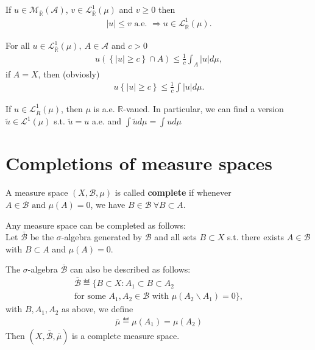 \begin{corollary}
    If \(u\in\mathcal{M}_{\overline{\mathbb{R}}}(\mathscr{A})\), \(v\in\mathcal{L}^{1}_{\overline{\mathbb{R}}}(\mu)\) and \(v\geq0\) then
    \begin{align*}
        \vert u\vert \leq v \text{ a.e. } \Rightarrow u\in\mathcal{L}^{1}_{\overline{\mathbb{R}}}(\mu).
    \end{align*}
\end{corollary}
\begin{proposition}
    For all \(u\in\mathcal{L}^{1}_{\overline{\mathbb{R}}}(\mu), \ A\in\mathscr{A}\) and \(c>0\)
    \begin{align*}
        u\left(\left\{ \vert u\vert \geq c \right\} \cap A\right) \leq \frac{1}{c}\int_{A}\vert u\vert d\mu,
    \end{align*}
    if \(A=X\), then (obviosly)
    \begin{align*}
        u\left\{ \vert u\vert \geq c \right\} \leq \frac{1}{c}\int \vert u\vert d\mu.
    \end{align*}
\end{proposition}    
\ifdetailed
\begin{corollary}
    If \(u\in\mathcal{L}^{1}_{\overline{R}}(\mu)\), then \(\mu\) is a.e. \(\mathbb{R}\)-vaued. In particular, we can find a version
    \(\tilde{u}\in \mathcal{L}^{1}(\mu)\) s.t. \(\tilde{u}=u\) a.e. and \(\int\tilde{u}d\mu = \int ud\mu\)
\end{corollary}
\fi

\section*{Completions of measure spaces}
\begin{definition}
    A measure space \(\left(X,\mathscr{B}, \mu\right)\) is called \textbf{complete} if whenever \(A\in\mathscr{B} \text{ and } \mu(A) =0\), we have \(B\in\mathscr{B} \ \forall B\subset A\).
\end{definition}
\begin{remark}
    Any measure space can be completed as follows: \\ 
    Let \(\bar{\mathscr{B}}\) be the \(\sigma\)-algebra generated by \(\mathscr{B}\) and all sets \(B\subset X\) s.t. there exists \(A\in\mathscr{B}\)
    with \(B\subset A\) and \(\mu(A)=0\).
\end{remark}
\begin{proposition}
    The \(\sigma\)-algebra \(\bar{\mathscr{B}}\) can also be described as follows:
    \begin{align*}
        \bar{\mathscr{B}} \eqdef \Biggl\{ B\subset X: A_1\subset B\subset A_2\\ \text{for some }A_1,A_2\in\mathscr{B}\text{ with }\mu(A_2\backslash A_1)=0 \Biggr\},
    \end{align*}
    with \(B,A_1,A_2 \) as above, we define 
    \begin{align*}
        \bar{\mu} \eqdef \mu(A_1) = \mu(A_2)
    \end{align*}
    Then \(\left( X,\bar{\mathscr{B}}, \bar{\mu} \right)\) is a complete measure space.
\end{proposition}

